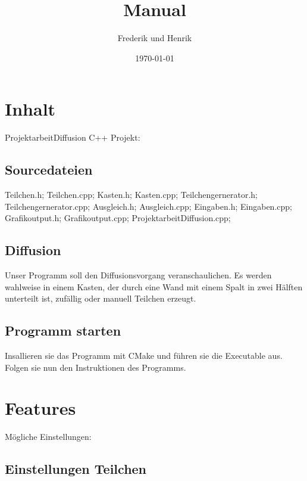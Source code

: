 \documentclass[14pt,a4paper]{scrartcl}
\title{Manual}
\author{Frederik und Henrik}
\date{\today}
\begin{document}
 
\maketitle
\tableofcontents
\section{Inhalt}
ProjektarbeitDiffusion C++ Projekt:

\subsection{Sourcedateien}
Teilchen.h;
Teilchen.cpp;
Kasten.h;
Kasten.cpp;
Teilchengernerator.h;
Teilchengernerator.cpp;
Ausgleich.h;
Ausgleich.cpp;
Eingaben.h;
Eingaben.cpp;
Grafikoutput.h;
Grafikoutput.cpp;
ProjektarbeitDiffusion.cpp;

\subsection{Diffusion}
Unser Programm soll den Diffusionsvorgang veranschaulichen.
Es werden wahlweise in einem Kasten, der durch eine Wand mit einem Spalt in zwei Hälften unterteilt ist, zufällig oder manuell Teilchen erzeugt.

\subsection{Programm starten}
Insallieren sie das Programm mit CMake und führen sie die Executable aus.
Folgen sie nun den Instruktionen des Programms.

\section{Features}
Mögliche Einstellungen:

\subsection{Einstellungen Teilchen}
\end{document}
